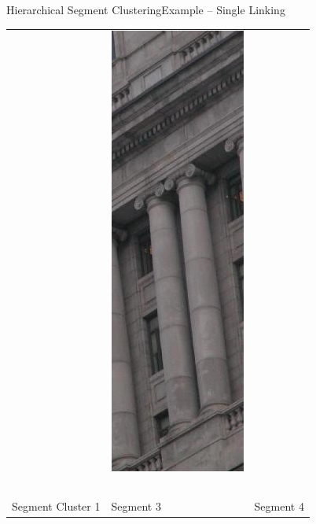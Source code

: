 \documentclass[10pt]{beamer}
\begin{document}
\begin{frame}{Hierarchical Segment Clustering}{Example -- Single Linking}
{\begin{center}
\begin{tabular}{>{\centering\arraybackslash}b{}>{\centering\arraybackslash}b{}>{\centering\arraybackslash}b{}}
		    & \includegraphics[scale=0.25]{./images/clustering/mcgill_20_segment_4.jpg}
		    \\~\\
		    Segment Cluster 1 & Segment 3 & Segment 4
	  \end{tabular}
	\end{center}
	}
\end{frame}
\end{document}
